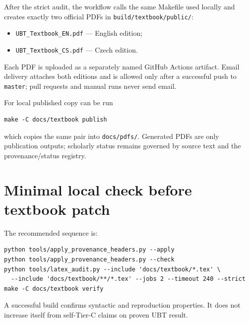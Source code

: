 After the strict audit, the workflow calls the same Makefile used locally and
creates exactly two official PDFs in \texttt{build/textbook/public/}:
\begin{itemize}
 \item \texttt{UBT\_Textbook\_EN.pdf} --- English edition;
 \item \texttt{UBT\_Textbook\_CS.pdf} --- Czech edition.
\end{itemize}
Each PDF is uploaded as a separately named GitHub Actions artifact. Email
delivery attaches both editions and is allowed only after a successful push
to \texttt{master}; pull requests and manual runs never send email.

For local published copy can be run
\begin{verbatim}
make -C docs/textbook publish
\end{verbatim}
which copies the same pair into \texttt{docs/pdfs/}. Generated PDFs are only
publication outputs; scholarly status remains governed by source text and the
provenance/status registry.

\section{Minimal local check before textbook patch}
The recommended sequence is:
\begin{verbatim}
python tools/apply_provenance_headers.py --apply
python tools/apply_provenance_headers.py --check
python tools/latex_audit.py --include 'docs/textbook/*.tex' \
  --include 'docs/textbook/**/*.tex' --jobs 2 --timeout 240 --strict
make -C docs/textbook verify
\end{verbatim}
A successful build confirms syntactic and reproduction properties. It does not increase itself from
self-Tier-C claims on proven UBT result.
